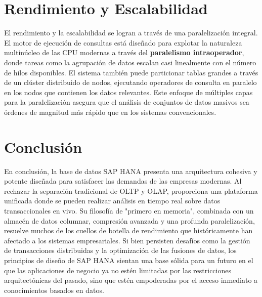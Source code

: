 \documentclass[12pt,a4paper]{article}
\begin{document}
\section*{Rendimiento y Escalabilidad}

El rendimiento y la escalabilidad se logran a través de una paralelización integral. El motor de ejecución de consultas está diseñado para explotar la naturaleza multinúcleo de las CPU modernas a través del \textbf{paralelismo intraoperador}, donde tareas como la agrupación de datos escalan casi linealmente con el número de hilos disponibles. El sistema también puede particionar tablas grandes a través de un clúster distribuido de nodos, ejecutando operadores de consulta en paralelo en los nodos que contienen los datos relevantes. Este enfoque de múltiples capas para la paralelización asegura que el análisis de conjuntos de datos masivos sea órdenes de magnitud más rápido que en los sistemas convencionales.

\section*{Conclusión}

En conclusión, la base de datos SAP HANA presenta una arquitectura cohesiva y potente diseñada para satisfacer las demandas de las empresas modernas. Al rechazar la separación tradicional de OLTP y OLAP, proporciona una plataforma unificada donde se pueden realizar análisis en tiempo real sobre datos transaccionales en vivo. Su filosofía de "primero en memoria", combinada con un almacén de datos columnar, compresión avanzada y una profunda paralelización, resuelve muchos de los cuellos de botella de rendimiento que históricamente han afectado a los sistemas empresariales. Si bien persisten desafíos como la gestión de transacciones distribuidas y la optimización de las fusiones de datos, los principios de diseño de SAP HANA sientan una base sólida para un futuro en el que las aplicaciones de negocio ya no estén limitadas por las restricciones arquitectónicas del pasado, sino que estén empoderadas por el acceso inmediato a conocimientos basados en datos.
\end{document}

